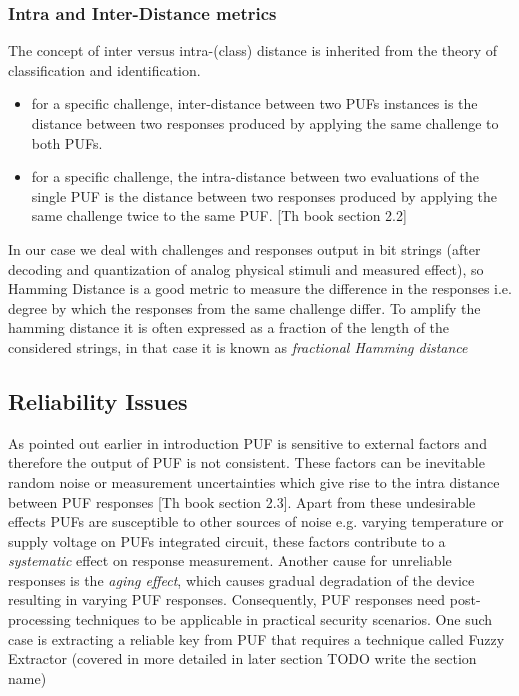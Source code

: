 \subsubsection{Intra and Inter-Distance metrics}
\label{intra_inter_section}
The concept of inter versus intra-(class) distance is inherited from the theory of classification and identification.
\begin{itemize}
	\item for a specific challenge, inter-distance between two PUFs instances is the distance between two responses produced by applying the same challenge to both PUFs.
	\item for a specific challenge, the intra-distance between two evaluations of the single PUF is the distance between two responses produced by applying the same challenge twice to the same PUF. [Th book section 2.2]
\end{itemize}

In our case we deal with challenges and responses output in bit strings (after decoding and quantization of analog physical stimuli and measured effect), so Hamming Distance is a good metric to measure the difference in the responses i.e. degree by which the responses from the same challenge differ. To amplify the hamming distance it is often expressed as a fraction of the length of the considered strings, in that case it is known as \emph{fractional Hamming distance}

\subsection{Reliability Issues}
As pointed out earlier in introduction PUF is sensitive to external factors and therefore the output of PUF is not consistent. These factors can be inevitable random noise or measurement uncertainties which give rise to the intra distance between PUF responses [Th book section 2.3]. Apart from these undesirable effects PUFs are susceptible to other sources of noise e.g. varying temperature or supply voltage on PUFs integrated circuit, these factors contribute to a \emph{systematic} effect on
response measurement. Another cause for unreliable responses is the \emph{aging effect}, which causes gradual degradation of the device resulting in varying PUF responses. Consequently, PUF responses need post-processing techniques to be applicable in practical security scenarios. One such case is extracting a reliable key from PUF that requires a technique called Fuzzy Extractor (covered in more detailed in later section TODO write the section name)

